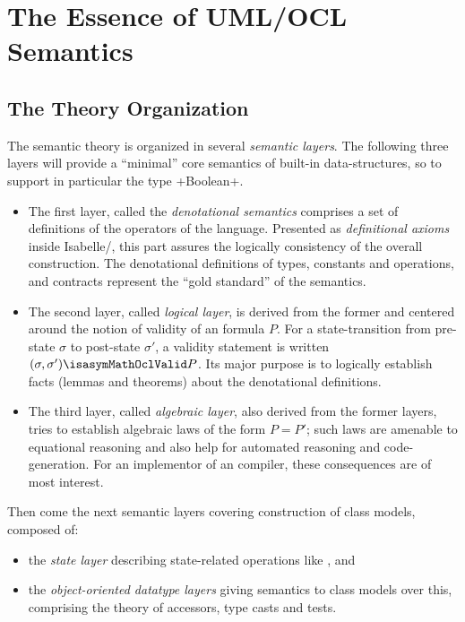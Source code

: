 \section{The Essence of UML/OCL Semantics}\label{sec:focl-semantics}
\subsection{The Theory Organization}
The semantic theory is organized in several
\emph{semantic layers}. The following three layers will provide a
``minimal'' core semantics of built-in data-structures, so to support
in particular the \OCL type \inlineocl+Boolean+.
\begin{itemize}
\item The first layer, called the \emph{denotational semantics}
  comprises a set of definitions of the operators of the language.
  Presented as \emph{definitional axioms} inside Isabelle/\HOL, this
  part assures the logically consistency of the overall
  construction. The denotational definitions of types, constants and
  operations, and \OCL contracts represent the ``gold standard'' of
  the semantics.
\item The second layer, called \emph{logical layer}, is derived from
  the former and centered around the notion of validity of an \OCL
  formula $P$. For a state-transition from pre-state $\sigma$ to
  post-state $\sigma'$, a validity statement is written $(\sigma,
  \sigma') \isasymMathOclValid P$. Its major purpose is to logically
  establish facts (lemmas and theorems) about the denotational
  definitions.
\item The third layer, called \emph{algebraic layer}, also derived
  from the former layers, tries to establish algebraic laws of the
  form $P = P'$; such laws are amenable to equational reasoning and
  also help for automated reasoning and code-generation. For an
  implementor of an \OCL compiler, these consequences are of most
  interest.
\end{itemize}

Then come the next semantic layers covering construction of \UML class
models, composed of:
\begin{itemize}
\item the \emph{state layer} describing state-related operations like
        , and
\item the \emph{object-oriented datatype layers} giving semantics to
  \UML class models over this, comprising the theory of accessors,
  type casts and tests.
\end{itemize}


